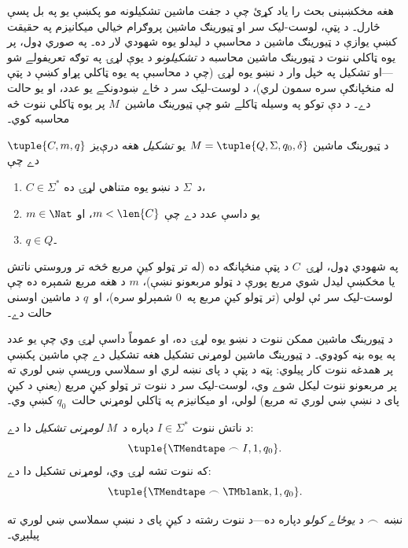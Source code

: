 \documentclass[../../../include/open-logic-section]{subfiles}
\begin{document}

\begin{explain}
هغه مخکښېنی بحث را ياد کړئ چې د جفت ماشين تشکيلونه مو پکښې يو په بل
پسې څارل۔ د پټې، لوست-ليک سر او ټيورينګ ماشين پروګرام خيالي ميکانيزم
په حقيقت کښې يوازې د ټيورينګ ماشين د محاسبې د ليدلو يوه شهودي لار ده۔
په صوري ډول، پر يوه ټاکلي ننوت د ټيورينګ ماشين محاسبه د
\emph{تشکيلونو} د يوې لړۍ په توګه تعريفولے شو---او تشکيل په خپل وار د
نښو يوه لړۍ (چې د محاسبې په يوه ټاکلي پړاو کښې د پټې له منځپانګې سره
سمون لري)، د لوست-ليک سر د ځاے ښودونکے يو عدد، او يو حالت دے۔ د دې
توکو په وسيله ټاکلے شو چې ټيورينګ ماشين~$M$ پر يوه ټاکلي ننوت څه
محاسبه کوي۔
\end{explain}

\begin{defn}[تشکيل]
د ټيورينګ ماشين $M = \tuple{Q, \Sigma, q_0,
\delta}$ يو \emph{تشکيل} هغه درې‌يز $\tuple{C, m, q}$ دے چې
\begin{enumerate}
\item $C \in \Sigma^*$ د~$\Sigma$ د نښو يوه متناهي لړۍ ده،
\item $m \in \Nat$ يو داسې عدد دے چې $m < \len{C}$، او
\item $q \in Q$۔
\end{enumerate}
په شهودي ډول، لړۍ~$C$ د پټې منځپانګه ده (له تر ټولو کيڼ مربع څخه تر
وروستي ناتش يا مخکښې ليدل شوي مربع پورې د ټولو مربعونو نښې)، $m$ د
هغه مربع شمېره ده چې لوست-ليک سر ئې لولي (تر ټولو کيڼ مربع په~$0$
شمېرلو سره)، او~$q$ د ماشين اوسنی حالت دے۔
\end{defn}

\begin{explain}
د ټيورينګ ماشين ممکن ننوت د نښو يوه لړۍ ده، او عموماً داسې لړۍ وي چې
يو عدد په يوه بڼه کوډوي۔ د ټيورينګ ماشين لومړنی تشکيل هغه تشکيل دے
چې ماشين پکښې پر همدغه ننوت کار پيلوي: پټه د پټې د پای نښه لري او
سملاسي ورپسې ښي لوري ته پر مربعونو ننوت ليکل شوے وي، لوست-ليک سر د
ننوت تر ټولو کيڼ مربع (يعنې د کيڼ پای د نښې ښي لوري ته مربع) لولي،
او ميکانيزم په ټاکلي لومړني حالت~$q_0$ کښې وي۔
\end{explain}

\begin{defn}
د ناتش ننوت $I \in \Sigma^*$ دپاره د~$M$ \emph{لومړنی تشکيل} دا دے:
\[
\tuple{\TMendtape \frown I, 1, q_0}.
\]
که ننوت تشه لړۍ وي، لومړنی تشکيل دا دے:
\[
\tuple{\TMendtape \frown \TMblank, 1, q_0}.
\]
\end{defn}

\begin{explain}
نښه~$\frown$ د \emph{يوځاے کولو} دپاره ده---د ننوت رشته د کيڼ پای د
نښې سملاسي ښي لوري ته پيلېږي۔
\end{explain}
\end{document}
